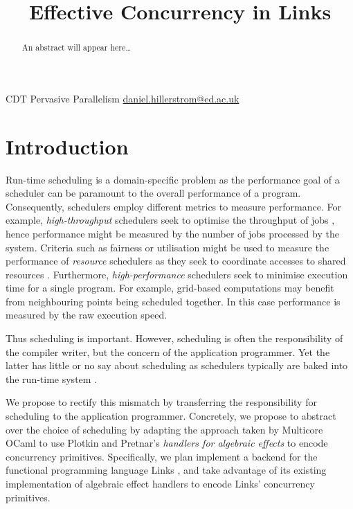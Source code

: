 \documentclass[preprint,10pt,numbers]{sigplanconf}
\begin{document}
\title{Effective Concurrency in Links}

           {CDT Pervasive Parallelism}
           {\href{mailto:daniel.hillerstrom@ed.ac.uk}{daniel.hillerstrom@ed.ac.uk}}
  \maketitle
  \begin{abstract}
    An abstract will appear here\dots
  \end{abstract}
  \raggedbottom
  \section{Introduction}
Run-time scheduling is a domain-specific problem as the performance goal of a scheduler can be paramount to the overall performance of a program. Consequently, schedulers employ different metrics to measure performance. For example, \emph{high-throughput} schedulers seek to optimise the throughput of jobs \cite{Berman2003}, hence performance might be measured by the number of jobs processed by the system. Criteria such as fairness or utilisation might be used to measure the performance of \emph{resource} schedulers as they seek to coordinate accesses to shared resources \cite{Berman2003}. Furthermore, \emph{high-performance} schedulers seek to minimise execution time for a single program. For example, grid-based computations may benefit from neighbouring points being scheduled together. In this case performance is measured by the raw execution speed.

Thus scheduling is important. However, scheduling is often the responsibility of the compiler writer, but the concern of the application programmer. Yet the latter has little or no say about scheduling as schedulers typically are baked into the run-time system \cite{Dolan2015}. 

We propose to rectify this mismatch by transferring the responsibility for scheduling to the application programmer. Concretely, we propose to abstract over the choice of scheduling by adapting the approach taken by Multicore OCaml \cite{Dolan2015} to use Plotkin and Pretnar's \emph{handlers for algebraic effects} \cite{Plotkin2013} to encode concurrency primitives. Specifically, we plan implement a backend for the functional programming language Links \cite{Cooper2006}, and take advantage of its existing implementation of algebraic effect handlers \cite{Hillerstrom2015} to encode Links' concurrency primitives.
\end{document}
